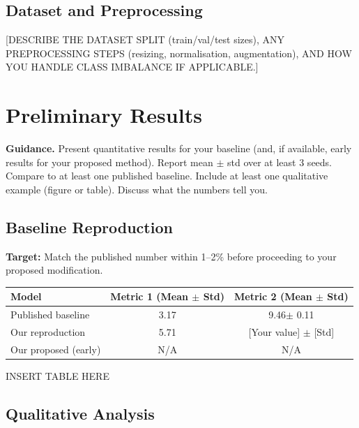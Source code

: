 \documentclass[11pt, letterpaper]{article}
\begin{document}
\subsection{Dataset and Preprocessing}

[DESCRIBE THE DATASET SPLIT (train/val/test sizes), ANY PREPROCESSING STEPS
(resizing, normalisation, augmentation), AND HOW YOU HANDLE CLASS IMBALANCE
IF APPLICABLE.]

\section{Preliminary Results}

\begin{guidancebox}
\textbf{Guidance.} Present quantitative results for your baseline (and, if
available, early results for your proposed method). Report mean $\pm$ std over
at least 3 seeds. Compare to at least one published baseline. Include at least
one qualitative example (figure or table). Discuss what the numbers tell you.
\end{guidancebox}

\subsection{Baseline Reproduction}

\begin{notebox}
\textbf{Target:} Match the published number within 1--2\% before proceeding
to your proposed modification.
\end{notebox}

\begin{center}
\begin{tabular}{lcc}
\toprule
\textbf{Model} & \textbf{Metric 1 (Mean $\pm$ Std)} & \textbf{Metric 2 (Mean $\pm$ Std)} \\
\midrule
Published baseline & 3.17 &  9.46$\pm$ 0.11 \\
Our reproduction & 5.71 & [Your value] $\pm$ [Std] \\
Our proposed (early) & N/A & N/A \\
\bottomrule
\end{tabular}

INSERT TABLE HERE

\end{center}

\subsection{Qualitative Analysis}
\end{document}
